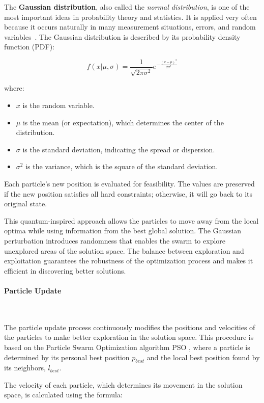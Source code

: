 The \textbf{Gaussian distribution}, also called the \textit{normal distribution}, is one of the most important ideas in probability theory and statistics. It is applied very often because it occurs naturally in many measurement situations, errors, and random variables~\cite{Blitzstein2014-intro}. The Gaussian distribution is described by its probability density function (PDF):

\[
f(x | \mu, \sigma) = \frac{1}{\sqrt{2 \pi \sigma^2}} e^{-\frac{(x - \mu)^2}{2 \sigma^2}}
\]

where:
\begin{itemize}
    \item \(x\) is the random variable.
    \item \(\mu\) is the mean (or expectation), which determines the center of the distribution.
    \item \(\sigma\) is the standard deviation, indicating the spread or dispersion.
    \item \(\sigma^2\) is the variance, which is the square of the standard deviation.
\end{itemize}

Each particle’s new position is evaluated for feasibility. The values are preserved if the new position satisfies all hard constraints; otherwise, it will go back to its original state.

This quantum-inspired approach allows the particles to move away from the local optima while using information from the best global solution. The Gaussian perturbation introduces randomness that enables the swarm to explore unexplored areas of the solution space. The balance between exploration and exploitation guarantees the robustness of the optimization process and makes it efficient in discovering better solutions.

\paragraph{Particle Update}\

The particle update process continuously modifies the positions and velocities of the particles to make better exploration in the solution space. This procedure is based on the Particle Swarm Optimization algorithm PSO \cite{kennedy1995particle}, where a particle is determined by its personal best position \(p_{best}\) and the local best position found by its neighbors, \(l_{best}\).

The velocity of each particle, which determines its movement in the solution space, is calculated using the formula:

